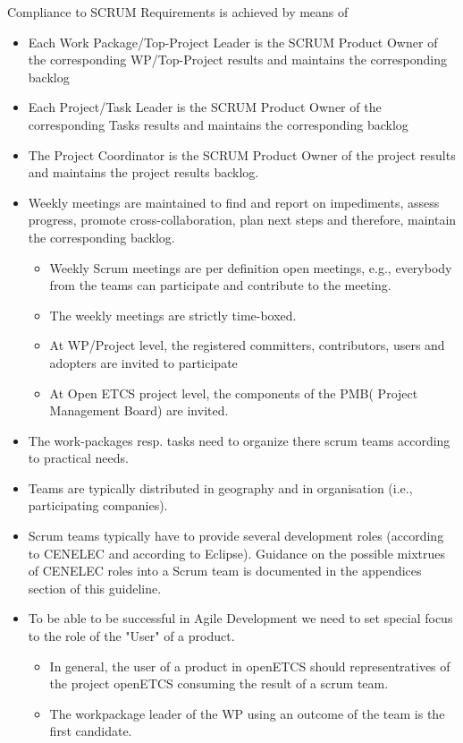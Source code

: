 Compliance to SCRUM Requirements is achieved by means of
\begin{itemize}
	\item Each Work Package/Top-Project Leader is the SCRUM Product Owner of the corresponding WP/Top-Project results and maintains the corresponding backlog
	\item Each Project/Task Leader is the SCRUM  Product Owner of the corresponding Tasks results  and maintains the corresponding backlog
	\item The Project Coordinator is the SCRUM Product Owner of the project results and maintains the project results backlog.
	\item Weekly meetings are maintained to find and report on impediments, assess progress, promote cross-collaboration, plan next steps and therefore, maintain the corresponding backlog.
	\begin{itemize}
		\item Weekly Scrum meetings are per definition open meetings, e.g., everybody from the teams can participate and contribute to the meeting.
		\item The weekly meetings are strictly time-boxed.
		\item At WP/Project level, the registered committers, contributors, users and adopters are invited to participate
		\item At Open ETCS project level, the components of the PMB( Project Management Board) are invited.
	\end{itemize} 
	\item The work-packages resp. tasks need to organize there scrum teams according to practical needs.
	\item Teams are typically distributed in geography and in organisation (i.e., participating companies).
	\item Scrum teams typically have to provide several development roles (according to CENELEC and according to Eclipse). Guidance on the possible mixtrues of CENELEC roles into a Scrum team is documented in the appendices section of this guideline.
	\item To be able to be successful in Agile Development we need to set special focus to the role of the "User" of a product.
	\begin{itemize}
		\item In general, the user of a product in openETCS should representratives of the project openETCS consuming the result of a scrum team. 
		\item The workpackage leader of the WP using an outcome of the team is the first candidate.

\end{itemize}
\end{itemize}
